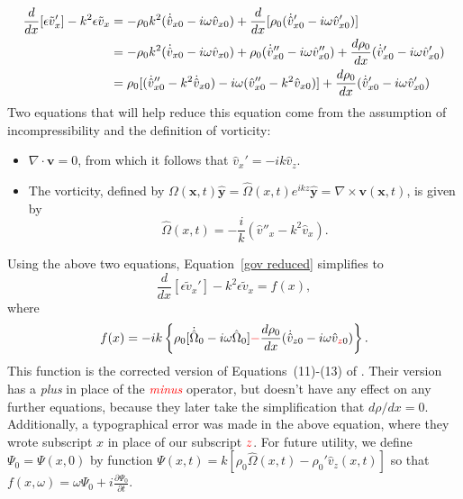 \documentclass[12pt]{../style-files/ociamthesis}
\begin{document}
\begin{align}
\frac{d}{dx} [\epsilon \tilde{v}_x'] - k^2\epsilon \tilde{v}_x & = - \rho_0 k^2(\dot{\hat{v}}_{x0} - i\omega\hat{v}_{x0}) + \frac{d}{dx}[\rho_0(\dot{\hat{v}}_{x0}' - i\omega\hat{v}_{x0}')] \notag \\
& = - \rho_0 k^2(\dot{\hat{v}}_{x0} - i\omega\hat{v}_{x0}) + \rho_0(\dot{\hat{v}}_{x0}'' - i\omega\hat{v}_{x0}'') + \frac{d\rho_0}{dx}(\dot{\hat{v}}_{x0}' - i\omega\hat{v}_{x0}') \notag \\
& = \rho_0[(\dot{\hat{v}}_{x0}'' - k^2\dot{\hat{v}}_{x0}) - i\omega(\hat{v}_{x0}'' - k^2\hat{v}_{x0})] + \frac{d\rho_0}{dx}(\dot{\hat{v}}_{x0}' - i\omega\hat{v}_{x0}')
\label{gov reduced}
\end{align}
Two equations that will help reduce this equation come from the assumption of incompressibility and the definition of vorticity:
\begin{itemize}
	\item $\nabla\cdot\mathbf{v} = 0$, from which it follows that $\hat{v}_x' = -ik \hat{v}_z$.
	\item The vorticity, defined by $\Omega(\mathbf{x},t)\mathbf{\hat{y}} = \hat{\Omega}(x,t)e^{ikz}\mathbf{\hat{y}} = \nabla \times \mathbf{v}(\mathbf{x},t)$, is given by	\begin{equation}
	\hat{\Omega}(x,t) = -\frac{i}{k}\left(\hat{v}''_x - k^2 \hat{v}_x\right).
	\end{equation}
\end{itemize}
Using the above two equations, Equation~\eqref{gov reduced} simplifies to
\begin{equation}
\frac{d}{dx} [\epsilon \tilde{v}_x'] - k^2\epsilon \tilde{v}_x = f(x), \label{gov}
\end{equation}
where
\begin{equation}f(x) = -ik\left\{\rho_0[\dot{\hat{\Omega}}_0 - i\omega\hat{\Omega}_0] \textcolor{red}{-} \frac{d\rho_0}{dx}(\dot{\hat{v}}_{z0} - i\omega\hat{v}_{\textcolor{red}{z}0})\right\}.
\end{equation} This function is the corrected version of Equations~(11)-(13) of \cite{rae_etal81}. Their version has a \textit{plus} in place of the \textcolor{red}{\textit{minus}} operator, but doesn't have any effect on any further equations, because they later take the simplification that $d\rho / dx = 0$. Additionally, a typographical error was made in the above equation, where they wrote subscript $x$ in place of our subscript $\textcolor{red}{z}$. For future utility, we define $\Psi_0 = \Psi(x, 0)$ by function $\Psi(x, t) = k[\rho_0\hat{\Omega}(x, t) - \rho_0'\hat{v}_z(x, t)]$ so that $f(x, \omega) = \omega \Psi_0 + i\frac{\partial \Psi_0}{\partial t}$.
\end{document}
